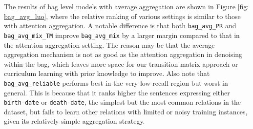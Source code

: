 The results of bag level models with average aggregation are shown in Figure \ref{fig: bag_avg_luo}, where the relative ranking of various settings is similar to those with attention aggregation.
A notable difference is that both \texttt{bag\_avg\_PR} and \texttt{bag\_avg\_mix\_TM} improve \texttt{bag\_avg\_mix} by a larger margin compared to that in the attention aggregation setting. The reason may be that the average aggregation mechanism is not as good as the attention aggregation in denoising within the bag, which leaves more space for our transition matrix approach or curriculum learning with prior knowledge to improve.
Also note that \texttt{bag\_avg\_reliable} performs best in the very-low-recall region but worst in general.
This is because that it ranks higher the sentences expressing either \texttt{birth-date} or \texttt{death-date}, the simplest but the most common relations in the dataset, but fails to learn other relations with limited or noisy training instances, given its relatively simple aggregation strategy.

